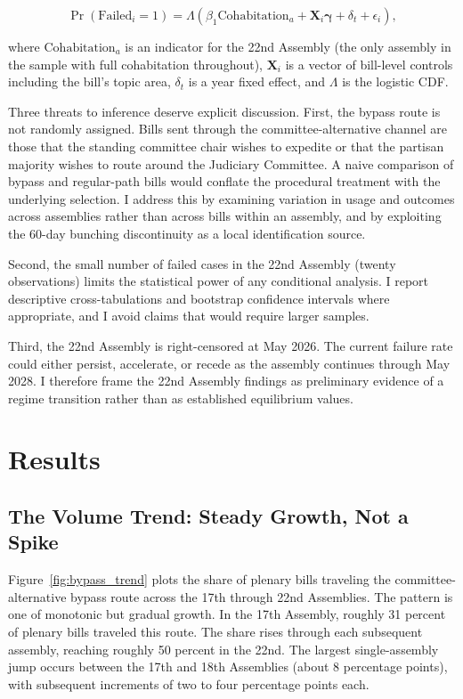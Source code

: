 \documentclass[11pt]{article}
\begin{document}
\begin{equation}
\Pr(\text{Failed}_i = 1) = \Lambda(\beta_1 \text{Cohabitation}_a + \mathbf{X}_i \boldsymbol{\gamma} + \delta_t + \epsilon_i),
\label{eq:logit}
\end{equation}

where $\text{Cohabitation}_a$ is an indicator for the 22nd Assembly (the only assembly in the sample with full cohabitation throughout), $\mathbf{X}_i$ is a vector of bill-level controls including the bill's topic area, $\delta_t$ is a year fixed effect, and $\Lambda$ is the logistic CDF.

Three threats to inference deserve explicit discussion. First, the bypass route is not randomly assigned. Bills sent through the committee-alternative channel are those that the standing committee chair wishes to expedite or that the partisan majority wishes to route around the Judiciary Committee. A naive comparison of bypass and regular-path bills would conflate the procedural treatment with the underlying selection. I address this by examining variation in usage and outcomes across assemblies rather than across bills within an assembly, and by exploiting the 60-day bunching discontinuity as a local identification source.

Second, the small number of failed cases in the 22nd Assembly (twenty observations) limits the statistical power of any conditional analysis. I report descriptive cross-tabulations and bootstrap confidence intervals where appropriate, and I avoid claims that would require larger samples.

Third, the 22nd Assembly is right-censored at May 2026. The current failure rate could either persist, accelerate, or recede as the assembly continues through May 2028. I therefore frame the 22nd Assembly findings as preliminary evidence of a regime transition rather than as established equilibrium values.

\section{Results}

\subsection{The Volume Trend: Steady Growth, Not a Spike}

Figure~\ref{fig:bypass_trend} plots the share of plenary bills traveling the committee-alternative bypass route across the 17th through 22nd Assemblies. The pattern is one of monotonic but gradual growth. In the 17th Assembly, roughly 31 percent of plenary bills traveled this route. The share rises through each subsequent assembly, reaching roughly 50 percent in the 22nd. The largest single-assembly jump occurs between the 17th and 18th Assemblies (about 8 percentage points), with subsequent increments of two to four percentage points each.
\end{document}
